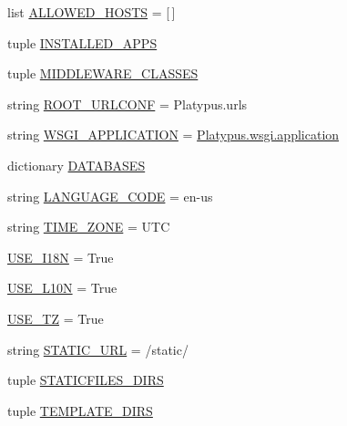 \begin{DoxyCompactItemize}
\item 
list \hyperlink{namespace_platypus_1_1settings_acef7d412cd11e277899731742228d304}{A\+L\+L\+O\+W\+E\+D\+\_\+\+H\+O\+S\+T\+S} = \mbox{[}$\,$\mbox{]}
\item 
tuple \hyperlink{namespace_platypus_1_1settings_a987c3c31e79426162bba4a525f150839}{I\+N\+S\+T\+A\+L\+L\+E\+D\+\_\+\+A\+P\+P\+S}
\item 
tuple \hyperlink{namespace_platypus_1_1settings_acb5170bcce1c81463df5170c9e53b4e3}{M\+I\+D\+D\+L\+E\+W\+A\+R\+E\+\_\+\+C\+L\+A\+S\+S\+E\+S}
\item 
string \hyperlink{namespace_platypus_1_1settings_a79c6cca950bb10c5d935bcba5682eeee}{R\+O\+O\+T\+\_\+\+U\+R\+L\+C\+O\+N\+F} = \textquotesingle{}Platypus.\+urls\textquotesingle{}
\item 
string \hyperlink{namespace_platypus_1_1settings_a932d82b584a8d3acfd7f96e431a8bdcf}{W\+S\+G\+I\+\_\+\+A\+P\+P\+L\+I\+C\+A\+T\+I\+O\+N} = \textquotesingle{}\hyperlink{namespace_platypus_1_1wsgi_a942289c73a116be14daec2618a9c7a12}{Platypus.\+wsgi.\+application}\textquotesingle{}
\item 
dictionary \hyperlink{namespace_platypus_1_1settings_a52c253859b1798aee0972f29f3c94f00}{D\+A\+T\+A\+B\+A\+S\+E\+S}
\item 
string \hyperlink{namespace_platypus_1_1settings_a0cb66ded6846c00b50227be07adf9ace}{L\+A\+N\+G\+U\+A\+G\+E\+\_\+\+C\+O\+D\+E} = \textquotesingle{}en-\/us\textquotesingle{}
\item 
string \hyperlink{namespace_platypus_1_1settings_aca87dae3dacd633f793eac09d3e200fe}{T\+I\+M\+E\+\_\+\+Z\+O\+N\+E} = \textquotesingle{}U\+T\+C\textquotesingle{}
\item 
\hyperlink{namespace_platypus_1_1settings_a90000f621e26aafdbb06eaada0a13187}{U\+S\+E\+\_\+\+I18\+N} = True
\item 
\hyperlink{namespace_platypus_1_1settings_afb4e4d80e8b9dcad6c91f66a318ee09b}{U\+S\+E\+\_\+\+L10\+N} = True
\item 
\hyperlink{namespace_platypus_1_1settings_ab1904f519eab28d99dbfc50f116c7b33}{U\+S\+E\+\_\+\+T\+Z} = True
\item 
string \hyperlink{namespace_platypus_1_1settings_a6ccc40e5617a0f11b6912e3b69e8c0c1}{S\+T\+A\+T\+I\+C\+\_\+\+U\+R\+L} = \textquotesingle{}/static/\textquotesingle{}
\item 
tuple \hyperlink{namespace_platypus_1_1settings_a57cbf107a021ecf8c4ef636af09fd903}{S\+T\+A\+T\+I\+C\+F\+I\+L\+E\+S\+\_\+\+D\+I\+R\+S}
\item 
tuple \hyperlink{namespace_platypus_1_1settings_ab156d619697e9ec9f9d435032956bc2c}{T\+E\+M\+P\+L\+A\+T\+E\+\_\+\+D\+I\+R\+S}
\end{DoxyCompactItemize}


